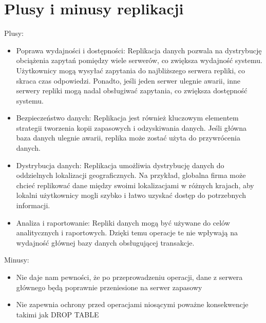 \documentclass[letterpaper,10pt,polish]{sphinxmanual}
\begin{document}
\section{Plusy i minusy replikacji}
\label{\detokenize{rozdzialy/rozdzial5:plusy-i-minusy-replikacji}}
\sphinxAtStartPar
Plusy:
\begin{itemize}
\item {} 
\sphinxAtStartPar
Poprawa wydajności i dostępności: Replikacja danych pozwala na dystrybucję obciążenia zapytań pomiędzy wiele serwerów, co zwiększa wydajność systemu. Użytkownicy mogą wysyłać zapytania do najbliższego serwera repliki, co skraca czas odpowiedzi. Ponadto, jeśli jeden serwer ulegnie awarii, inne serwery repliki mogą nadal obsługiwać zapytania, co zwiększa dostępność systemu.

\item {} 
\sphinxAtStartPar
Bezpieczeństwo danych: Replikacja jest również kluczowym elementem strategii tworzenia kopii zapasowych i odzyskiwania danych. Jeśli główna baza danych ulegnie awarii, replika może zostać użyta do przywrócenia danych.

\item {} 
\sphinxAtStartPar
Dystrybucja danych: Replikacja umożliwia dystrybucję danych do oddzielnych lokalizacji geograficznych. Na przykład, globalna firma może chcieć replikować dane między swoimi lokalizacjami w różnych krajach, aby lokalni użytkownicy mogli szybko i łatwo uzyskać dostęp do potrzebnych informacji.

\item {} 
\sphinxAtStartPar
Analiza i raportowanie: Repliki danych mogą być używane do celów analitycznych i raportowych. Dzięki temu operacje te nie wpływają na wydajność głównej bazy danych obsługującej transakcje.

\end{itemize}

\sphinxAtStartPar
Minusy:
\begin{itemize}
\item {} 
\sphinxAtStartPar
Nie daje nam pewności, że po przeprowadzeniu operacji, dane z serwera głównego będą poprawnie przeniesione na serwer zapasowy

\item {} 
\sphinxAtStartPar
Nie zapewnia ochrony przed operacjami niosącymi poważne konsekwencje \sphinxhyphen{} takimi jak DROP TABLE

\end{itemize}

\sphinxstepscope
\end{document}
